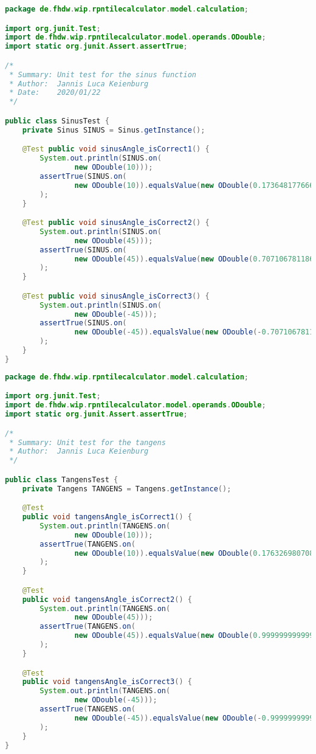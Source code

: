 \begin{lstlisting}[caption=SinusTest (Keienburg),label=list:SinusTest,language=Java]
package de.fhdw.wip.rpntilecalculator.model.calculation;

import org.junit.Test;
import de.fhdw.wip.rpntilecalculator.model.operands.ODouble;
import static org.junit.Assert.assertTrue;

/*
 * Summary: Unit test for the sinus function
 * Author:  Jannis Luca Keienburg
 * Date:    2020/01/22
 */

public class SinusTest {
    private Sinus SINUS = Sinus.getInstance();

    @Test public void sinusAngle_isCorrect1() {
        System.out.println(SINUS.on(
                new ODouble(10)));
        assertTrue(SINUS.on(
                new ODouble(10)).equalsValue(new ODouble(0.17364817766693033))
        );
    }

    @Test public void sinusAngle_isCorrect2() {
        System.out.println(SINUS.on(
                new ODouble(45)));
        assertTrue(SINUS.on(
                new ODouble(45)).equalsValue(new ODouble(0.7071067811865475))
        );
    }

    @Test public void sinusAngle_isCorrect3() {
        System.out.println(SINUS.on(
                new ODouble(-45)));
        assertTrue(SINUS.on(
                new ODouble(-45)).equalsValue(new ODouble(-0.7071067811865475))
        );
    }
}
\end{lstlisting} 

\begin{lstlisting}[caption=TangensTest (Keienburg),label=list:TangensTest,language=Java]
package de.fhdw.wip.rpntilecalculator.model.calculation;

import org.junit.Test;
import de.fhdw.wip.rpntilecalculator.model.operands.ODouble;
import static org.junit.Assert.assertTrue;

/*
 * Summary: Unit test for the tangens
 * Author:  Jannis Luca Keienburg
 */

public class TangensTest {
    private Tangens TANGENS = Tangens.getInstance();

    @Test
    public void tangensAngle_isCorrect1() {
        System.out.println(TANGENS.on(
                new ODouble(10)));
        assertTrue(TANGENS.on(
                new ODouble(10)).equalsValue(new ODouble(0.17632698070846498))
        );
    }

    @Test
    public void tangensAngle_isCorrect2() {
        System.out.println(TANGENS.on(
                new ODouble(45)));
        assertTrue(TANGENS.on(
                new ODouble(45)).equalsValue(new ODouble(0.9999999999999999))
        );
    }

    @Test
    public void tangensAngle_isCorrect3() {
        System.out.println(TANGENS.on(
                new ODouble(-45)));
        assertTrue(TANGENS.on(
                new ODouble(-45)).equalsValue(new ODouble(-0.9999999999999999))
        );
    }
}
\end{lstlisting} 

